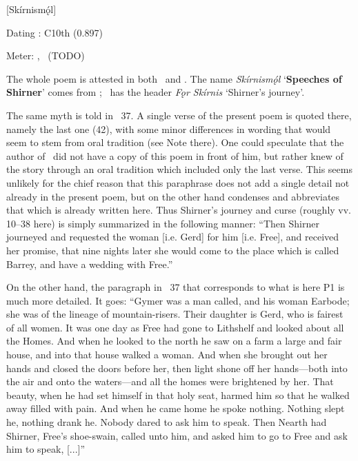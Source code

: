 [Skírnismǫ́l]

\begin{flushright}%
Dating \parencite{Sapp2022}: C10th (0.897)

Meter: \Ljodahattr, \Galdralag\ (TODO)%
\end{flushright}


The whole poem is attested in both \Regius\ and \AM. The name \emph{Skírnismǫ́l} ‘\textbf{Speeches of Shirner}’ comes from \AM; \Regius\ has the header \emph{Fǫr Skírnis} ‘Shirner’s journey’.

The same myth is told in \Gylfaginning\ 37. A single verse of the present poem is quoted there, namely the last one (42), with some minor differences in wording that would seem to stem from oral tradition (see Note there). One could speculate that the author of \Gylfaginning\ did not have a copy of this poem in front of him, but rather knew of the story through an oral tradition which included only the last verse. This seems unlikely for the chief reason that this paraphrase does not add a single detail not already in the present poem, but on the other hand condenses and abbreviates that which is already written here. Thus Shirner’s journey and curse (roughly vv. 10–38 here) is simply summarized in the following manner: “Then Shirner journeyed and requested the woman [i.e. Gerd] for him [i.e. Free], and received her promise, that nine nights later she would come to the place which is called Barrey, and have a wedding with Free.”

On the other hand, the paragraph in \Gylfaginning\ 37 that corresponds to what is here P1 is much more detailed. It goes: “Gymer was a man called, and his woman Earbode; she was of the lineage of mountain-risers. Their daughter is Gerd, who is fairest of all women. It was one day as Free had gone to Lithshelf and looked about all the Homes. And when he looked to the north he saw on a farm a large and fair house, and into that house walked a woman. And when she brought out her hands and closed the doors before her, then light shone off her hands—both into the air and onto the waters—and all the homes were brightened by her. That beauty, when he had set himself in that holy seat, harmed him so that he walked away filled with pain. And when he came home he spoke nothing. Nothing slept he, nothing drank he. Nobody dared to ask him to speak. Then Nearth had Shirner, Free’s shoe-swain, called unto him, and asked him to go to Free and ask him to speak, [...]”

